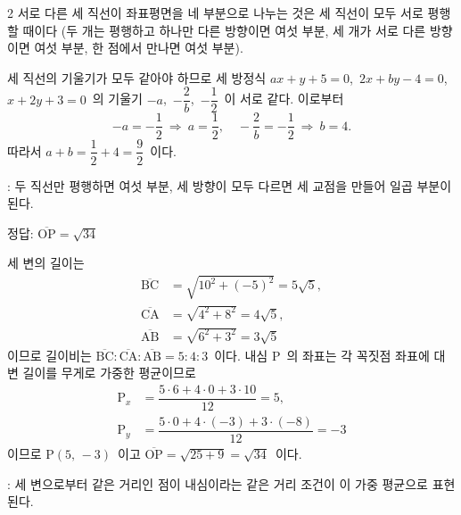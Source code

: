 \documentclass[10pt,fleqn]{article}
\begin{document}
\begin{multicols*}{2}
서로 다른 세 직선이 좌표평면을 네 부분으로 나누는 것은 세 직선이 모두 서로 평행할 때이다 (두 개는 평행하고 하나만 다른 방향이면 여섯 부분, 세 개가 서로 다른 방향이면 여섯 부분, 한 점에서 만나면 여섯 부분).

세 직선의 기울기가 모두 같아야 하므로 세 방정식 $ax + y + 5 = 0$,\ $2x + by - 4 = 0$,\ $x + 2y + 3 = 0$\ 의 기울기 $-a$,\ $-\dfrac{2}{b}$,\ $-\dfrac{1}{2}$\ 이 서로 같다. 이로부터
\[ -a = -\dfrac{1}{2}\ \Rightarrow\ a = \dfrac{1}{2},\quad -\dfrac{2}{b} = -\dfrac{1}{2}\ \Rightarrow\ b = 4. \]
따라서 $a + b = \dfrac{1}{2} + 4 = \dfrac{9}{2}$\ 이다.

\begin{dmcriticalpoint}
: 두 직선만 평행하면 여섯 부분, 세 방향이 모두 다르면 세 교점을 만들어 일곱 부분이 된다.
\end{dmcriticalpoint}

\begin{dmanswerbox}
정답: $\overline{\mathrm{OP}}=\sqrt{34}$
\end{dmanswerbox}

세 변의 길이는
\begin{align*}
  \overline{\mathrm{BC}} &= \sqrt{10^2 + (-5)^2} = 5\sqrt{5},\\
  \overline{\mathrm{CA}} &= \sqrt{4^2 + 8^2} = 4\sqrt{5},\\
  \overline{\mathrm{AB}} &= \sqrt{6^2 + 3^2} = 3\sqrt{5}
\end{align*}
이므로 길이비는 $\overline{\mathrm{BC}} : \overline{\mathrm{CA}} : \overline{\mathrm{AB}} = 5 : 4 : 3$\ 이다. 내심 $\mathrm{P}$\ 의 좌표는 각 꼭짓점 좌표에 대변 길이를 무게로 가중한 평균이므로
\begin{align*}
  \mathrm{P}_x &= \dfrac{5 \cdot 6 + 4 \cdot 0 + 3 \cdot 10}{12} = 5,\\
  \mathrm{P}_y &= \dfrac{5 \cdot 0 + 4 \cdot (-3) + 3 \cdot (-8)}{12} = -3
\end{align*}
이므로 $\mathrm{P}(5,\, -3)$\ 이고 $\overline{\mathrm{OP}} = \sqrt{25 + 9} = \sqrt{34}$\ 이다.

\begin{dmcriticalpoint}
: 세 변으로부터 같은 거리인 점이 내심이라는 같은 거리 조건이 이 가중 평균으로 표현된다.
\end{dmcriticalpoint}

\end{multicols*}
\end{document}
